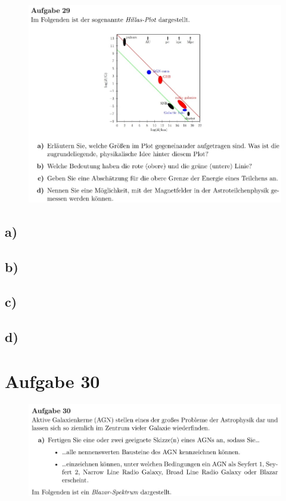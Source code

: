 \begin{figure}[H]
    \centering
    \includegraphics[width=\textwidth]{images/Aufgabe29.jpg}
\end{figure}

\subsection{a)}

\subsection{b)}

\subsection{c)}

\subsection{d)}

\section{Aufgabe 30}

\begin{figure}[H]
    \centering
    \includegraphics[width=\textwidth]{images/Aufgabe30a.jpg}
\end{figure}

